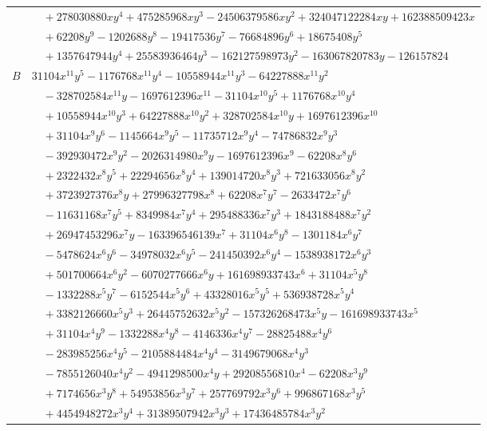 \documentclass[11pt]{article}
\begin{document}
\begin{longtable}{@{}ll@{}}
 & $\quad +278030880xy^{4}+475285968xy^{3}-24506379586xy^{2}+324047122284xy+162388509423x$\\
 & $\quad +62208y^{9}-1202688y^{8}-19417536y^{7}-76684896y^{6}+18675408y^{5}$\\
 & $\quad +1357647944y^{4}+25583936464y^{3}-162127598973y^{2}-163067820783y-126157824$\\
$B$ & $31104x^{11}y^{5}-1176768x^{11}y^{4}-10558944x^{11}y^{3}-64227888x^{11}y^{2}$\\
 & $\quad -328702584x^{11}y-1697612396x^{11}-31104x^{10}y^{5}+1176768x^{10}y^{4}$\\
 & $\quad +10558944x^{10}y^{3}+64227888x^{10}y^{2}+328702584x^{10}y+1697612396x^{10}$\\
 & $\quad +31104x^{9}y^{6}-1145664x^{9}y^{5}-11735712x^{9}y^{4}-74786832x^{9}y^{3}$\\
 & $\quad -392930472x^{9}y^{2}-2026314980x^{9}y-1697612396x^{9}-62208x^{8}y^{6}$\\
 & $\quad +2322432x^{8}y^{5}+22294656x^{8}y^{4}+139014720x^{8}y^{3}+721633056x^{8}y^{2}$\\
 & $\quad +3723927376x^{8}y+27996327798x^{8}+62208x^{7}y^{7}-2633472x^{7}y^{6}$\\
 & $\quad -11631168x^{7}y^{5}+8349984x^{7}y^{4}+295488336x^{7}y^{3}+1843188488x^{7}y^{2}$\\
 & $\quad +26947453296x^{7}y-163396546139x^{7}+31104x^{6}y^{8}-1301184x^{6}y^{7}$\\
 & $\quad -5478624x^{6}y^{6}-34978032x^{6}y^{5}-241450392x^{6}y^{4}-1538938172x^{6}y^{3}$\\
 & $\quad +501700664x^{6}y^{2}-6070277666x^{6}y+161698933743x^{6}+31104x^{5}y^{8}$\\
 & $\quad -1332288x^{5}y^{7}-6152544x^{5}y^{6}+43328016x^{5}y^{5}+536938728x^{5}y^{4}$\\
 & $\quad +3382126660x^{5}y^{3}+26445752632x^{5}y^{2}-157326268473x^{5}y-161698933743x^{5}$\\
 & $\quad +31104x^{4}y^{9}-1332288x^{4}y^{8}-4146336x^{4}y^{7}-28825488x^{4}y^{6}$\\
 & $\quad -283985256x^{4}y^{5}-2105884484x^{4}y^{4}-3149679068x^{4}y^{3}$\\
 & $\quad -7855126040x^{4}y^{2}-4941298500x^{4}y+29208556810x^{4}-62208x^{3}y^{9}$\\
 & $\quad +7174656x^{3}y^{8}+54953856x^{3}y^{7}+257769792x^{3}y^{6}+996867168x^{3}y^{5}$\\
 & $\quad +4454948272x^{3}y^{4}+31389507942x^{3}y^{3}+17436485784x^{3}y^{2}$\\

\end{longtable}
\end{document}
